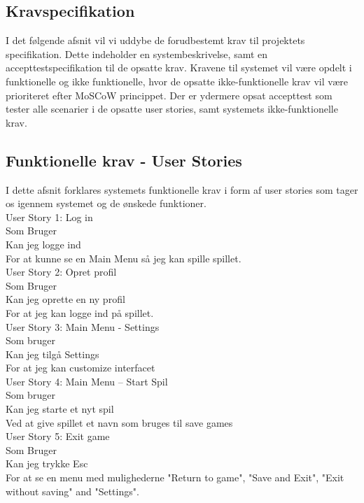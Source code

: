 \subsection{Kravspecifikation}

I det følgende afsnit vil vi uddybe de forudbestemt krav til projektets specifikation. Dette indeholder en systembeskrivelse, samt en accepttestspecifikation til de opsatte krav.
Kravene til systemet vil være opdelt i funktionelle og ikke funktionelle, hvor de opsatte ikke-funktionelle krav vil være prioriteret efter MoSCoW princippet.
Der er ydermere opsat accepttest som tester alle scenarier i de opsatte user stories, samt systemets ikke-funktionelle krav.

\subsection{Funktionelle krav - User Stories}
I dette afsnit forklares systemets funktionelle krav i form af user stories som tager os igennem systemet og de ønskede funktioner. \\
 
User Story 1: Log in \\
  Som Bruger \\
  Kan jeg logge ind \\
  For at kunne se en Main Menu så jeg kan spille spillet. \\
  
User Story 2: Opret profil \\
  Som Bruger \\
  Kan jeg oprette en ny profil \\
  For at jeg kan logge ind på spillet. \\

User Story 3: Main Menu - Settings \\
  Som bruger \\
  Kan jeg tilgå Settings \\
  For at jeg kan customize interfacet \\

User Story 4: Main Menu -- Start Spil \\
  Som bruger \\
  Kan jeg starte et nyt spil \\ 
  Ved at give spillet et navn som bruges til save games \\

User Story 5: Exit game \\
  Som Bruger \\ 
  Kan jeg trykke Esc \\
  For at se en menu med mulighederne "Return to game", "Save and Exit", "Exit without saving" and "Settings". \\

